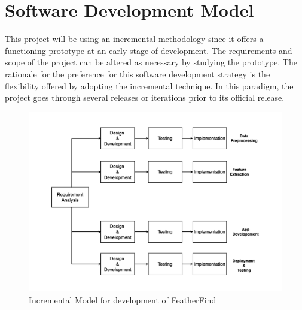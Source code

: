 \newpage
\section{Software Development Model}
This project will be using an incremental methodology since it offers a
functioning prototype at an early stage of development. The requirements and
scope of the project can be altered as necessary by studying the prototype. The
rationale for the preference for this software development strategy is the
flexibility offered by adopting the incremental technique. In this paradigm,
the project goes through several releases or iterations prior to its official
release.
\begin{figure}[h!]
    \includegraphics[scale=0.25]{images/SDLC.png}
    \caption{Incremental Model for development of
        FeatherFind}%
\end{figure}
\newpage

